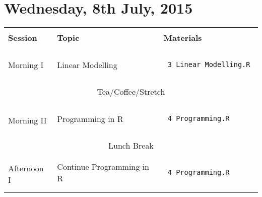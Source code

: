 \documentclass{article}[12pt]
\begin{document}
\section*{Wednesday, 8th July, 2015}
\begin{table}[h!]
\begin{tabular}{ |p{2cm}|p{5cm}|p{6cm}| }
\hline
                               &                              & \\
\textbf{Session}               & \textbf{Topic}               & \textbf{Materials} \\ 
                               &                              & \\ \hline \hline
 & & \\
Morning I                   & Linear Modelling                & \begin{verbatim} 3_Linear_Modelling.R \end{verbatim} \\ %
                            &                              &  \\ \hline
\multicolumn{3}{c}{} \\ 
\multicolumn{3}{c}{Tea/Coffee/Stretch}  \\ 
\multicolumn{3}{c}{} \\ \hline
 & & \\
\multirow{2}{*}{Morning II}    & Programming in R             & \begin{verbatim} 4_Programming.R \end{verbatim} \\
                               &                              &  \\ \hline
\multicolumn{3}{c}{} \\ 
\multicolumn{3}{c}{Lunch Break}  \\ 
\multicolumn{3}{c}{} \\ \hline
                               &                              &  \\ 
\multirow{2}{*}{Afternoon I}   & Continue Programming in R    &  \begin{verbatim} 4_Programming.R \end{verbatim} \\
                               &                              &  \\ \hline
\multicolumn{3}{c}{} \\

\end{tabular}
\end{table}
\end{document}
